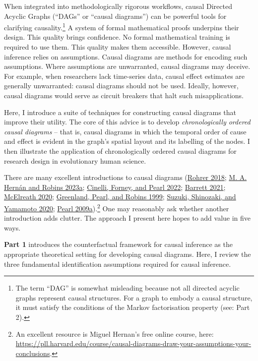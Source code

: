 \documentclass[
  singlecolumn]{article}
\begin{document}
When integrated into methodologically rigorous workflows, causal
Directed Acyclic Graphs (``DAGs'' or ``causal diagrams'') can be
powerful tools for clarifying causality.\footnote{The term ``DAG'' is
  somewhat misleading because not all directed acyclic graphs represent
  causal structures. For a graph to embody a causal structure, it must
  satisfy the conditions of the Markov factorisation property (see: Part
  2).} A system of formal mathematical proofs underpins their design.
This quality brings confidence. No formal mathematical training is
required to use them. This quality makes them accessible. However,
causal inference relies on assumptions. Causal diagrams are methods for
encoding such assumptions. Where assumptions are unwarranted, causal
diagrams may deceive. For example, when researchers lack time-series
data, causal effect estimates are generally unwarranted: causal diagrams
should not be used. Ideally, however, causal diagrams would serve as
circuit breakers that halt such misapplications.

Here, I introduce a suite of techniques for constructing causal diagrams
that improve their utility. The core of this advice is to develop
\emph{chronologically ordered causal diagrams} -- that is, causal
diagrams in which the temporal order of cause and effect is evident in
the graph's spatial layout and its labelling of the nodes. I then
illustrate the application of chronologically ordered causal diagrams
for research design in evolutionary human science.

There are many excellent introductions to causal diagrams
(\protect\hyperlink{ref-rohrer2018}{Rohrer 2018};
\protect\hyperlink{ref-hernuxe1n2023}{M. A. Hernán and Robins 2023a};
\protect\hyperlink{ref-cinelli2022}{Cinelli, Forney, and Pearl 2022};
\protect\hyperlink{ref-barrett2021}{Barrett 2021};
\protect\hyperlink{ref-mcelreath2020}{McElreath 2020};
\protect\hyperlink{ref-greenland1999}{Greenland, Pearl, and Robins
1999}; \protect\hyperlink{ref-suzuki2020}{Suzuki, Shinozaki, and
Yamamoto 2020}; \protect\hyperlink{ref-pearl2009}{Pearl
2009a}).\footnote{An excellent resource is Miguel Hernan's free online
  course, here:
  \url{https://pll.harvard.edu/course/causal-diagrams-draw-your-assumptions-your-conclusions}.}
One may reasonably ask whether another introduction adds clutter. The
approach I present here hopes to add value in five ways.

\textbf{Part 1} introduces the counterfactual framework for causal
inference as the appropriate theoretical setting for developing causal
diagrams. Here, I review the three fundamental identification
assumptions required for causal inference.
\end{document}
